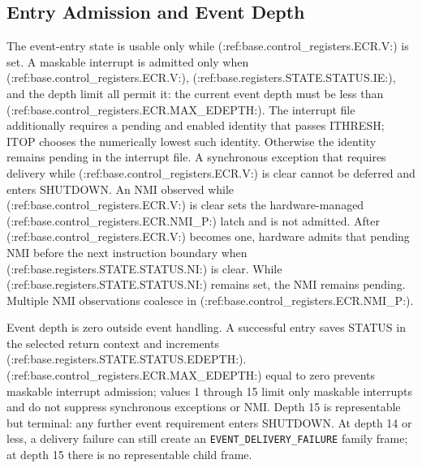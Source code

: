 \subsection{Entry Admission and Event Depth}
The event-entry state is usable only while (:ref:base.control_registers.ECR.V:) is set. A maskable interrupt is admitted only when (:ref:base.control_registers.ECR.V:),
(:ref:base.registers.STATE.STATUS.IE:), and the depth limit all permit it: the current event depth must be less than (:ref:base.control_registers.ECR.MAX_EDEPTH:). The
interrupt file additionally requires a pending and enabled identity that passes ITHRESH; ITOP chooses the numerically
lowest such identity. Otherwise the identity remains pending in the interrupt file. A synchronous exception that requires delivery while (:ref:base.control_registers.ECR.V:) is
clear cannot be deferred and enters SHUTDOWN. An NMI observed while (:ref:base.control_registers.ECR.V:) is clear sets the hardware-managed
(:ref:base.control_registers.ECR.NMI_P:) latch and is not admitted. After (:ref:base.control_registers.ECR.V:) becomes one, hardware admits that pending NMI before the next
instruction boundary when (:ref:base.registers.STATE.STATUS.NI:) is clear. While (:ref:base.registers.STATE.STATUS.NI:) remains set, the NMI remains pending. Multiple NMI
observations coalesce in (:ref:base.control_registers.ECR.NMI_P:).

Event depth is zero outside event handling. A successful entry saves STATUS in the selected return context and
increments (:ref:base.registers.STATE.STATUS.EDEPTH:). (:ref:base.control_registers.ECR.MAX_EDEPTH:) equal to zero prevents maskable interrupt admission; values 1 through 15 limit
only maskable interrupts and do not suppress synchronous exceptions or NMI. Depth 15 is representable but terminal:
any further event requirement enters SHUTDOWN. At depth 14 or less, a delivery failure can still create an
\texttt{EVENT\_DELIVERY\_FAILURE} family frame; at depth 15 there is no representable child frame.
